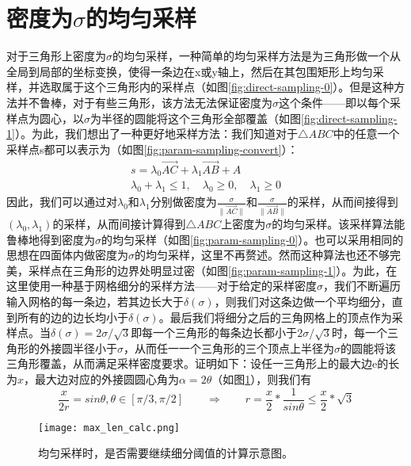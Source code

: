 \section{密度为$\sigma$的均匀采样}
对于三角形上密度为$\sigma$的均匀采样，一种简单的均匀采样方法是为三角形做一个从全局到局部的坐标变换，使得一条边在x或y轴上，然后在其包围矩形上均匀采样，并选取属于这个三角形内的采样点（如图\ref{fig:direct-sampling-0}）。但是这种方法并不鲁棒，对于有些三角形，该方法无法保证密度为$\sigma$这个条件——即以每个采样点为圆心，以$\sigma$为半径的圆能将这个三角形全部覆盖（如图\ref{fig:direct-sampling-1}）。为此，我们想出了一种更好地采样方法：我们知道对于$\triangle ABC$中的任意一个采样点s都可以表示为（如图\ref{fig:param-sampling-convert}）：
\begin{equation}
  \begin{split}
    s = \lambda_0 \overrightarrow{AC}+\lambda_1 \overrightarrow{AB} + A\\
    \lambda_0 + \lambda_1 \leq 1, \quad \lambda_0 \geq 0, \quad \lambda_1 \geq 0
  \end{split}
\end{equation}
因此，我们可以通过对$\lambda_0$和$\lambda_1$分别做密度为$\frac{\sigma}{\parallel \overrightarrow{AC} \parallel}$和$\frac{\sigma}{\parallel \overrightarrow{AB} \parallel}$的采样，从而间接得到$(\lambda_0,\lambda_1)$的采样，从而间接计算得到$\triangle ABC$上密度为$\sigma$的均匀采样。该采样算法能鲁棒地得到密度为$\sigma$的均匀采样（如图\ref{fig:param-sampling-0}）。也可以采用相同的思想在四面体内做密度为$\sigma$的均匀采样，这里不再赘述。然而这种算法也还不够完美，采样点在三角形的边界处明显过密（如图\ref{fig:param-sampling-1}）。为此，在这里使用一种基于网格细分的采样方法——对于给定的采样密度$\sigma$，我们不断遍历输入网格的每一条边，若其边长大于$\delta(\sigma)$，则我们对这条边做一个平均细分，直到所有的边的边长均小于$\delta(\sigma)$。最后我们将细分之后的三角网格上的顶点作为采样点。当$\delta(\sigma)=2\sigma/\sqrt{3}$即每一个三角形的每条边长都小于$2\sigma/\sqrt{3}$时，每一个三角形的外接圆半径小于$\sigma$，从而任一一个三角形的三个顶点上半径为$\sigma$的圆能将该三角形覆盖，从而满足采样密度要求。证明如下：设任一三角形上的最大边e的长为$x$，最大边对应的外接圆圆心角为$\alpha = 2\theta$（如图\ref{fig:max-len-calc}），则我们有
\begin{equation}
  \frac{x}{2r} = sin\theta, \theta \in [\pi/3, \pi/2] \qquad
  \Rightarrow \qquad r =\frac{x}{2} * \frac{1}{sin \theta} \leq \frac{x}{2} * \sqrt{3}
\end{equation}

\begin{figure}[htbp]
  \centering
  \texttt{[image: max\_len\_calc.png]}
  \caption[均匀采样细分阈值]{均匀采样时，是否需要继续细分阈值的计算示意图。}
  \label{fig:max-len-calc}
\end{figure}

